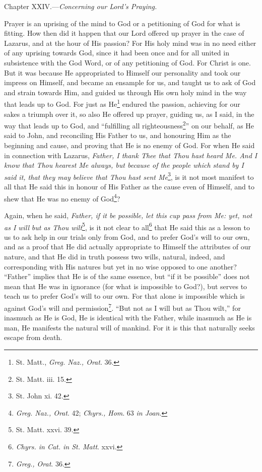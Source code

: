 
Chapter XXIV.—\emph{Concerning our Lord’s Praying.}

Prayer is an uprising of the mind to God or a petitioning of God for what is fitting. How then did it happen that our Lord offered up prayer in the case of Lazarus, and at the hour of His passion? For His holy mind was in no need either of any uprising towards God, since it had been once and for all united in subsistence with the God Word, or of any petitioning of God. For Christ is one. But it was because He appropriated to Himself our personality and took our impress on Himself, and became an ensample for us, and taught us to ask of God and strain towards Him, and guided us through His own holy mind in the way that leads up to God. For just as He\footnote{St. Matt., \emph{Greg. Naz., Orat}. 36.} endured the passion, achieving for our sakes a triumph over it, so also He offered up prayer, guiding us, as I said, in the way that leads up to God, and “fulfilling all righteousness\footnote{St. Matt. iii. 15.}” on our behalf, as He said to John, and reconciling His Father to us, and honouring Him as the beginning and cause, and proving that He is no enemy of God. For when He said in connection with Lazarus, \emph{Father, I thank Thee that Thou hast heard Me. And I know that Thou hearest Me always, but because of the people which stand by I said it, that they may believe that Thou hast sent Me}\footnote{St. John xi. 42.}, is it not most manifest to all that He said this in honour of His Father as the cause even of Himself, and to shew that He was no enemy of God\footnote{\emph{Greg. Naz., Orat}. 42; \emph{Chyrs., Hom}. 63 \emph{in Joan}.}?

Again, when he said, \emph{Father, if it be possible, let this cup pass from Me: yet, not as I will} \emph{but as Thou wilt}\footnote{St. Matt. xxvi. 39.}, is it not clear to all\footnote{\emph{Chyrs. in Cat. in St. Matt}. xxvi.} that He said this as a lesson to us to ask help in our trials only from God, and to prefer God’s will to our own, and as a proof that He did actually appropriate to Himself the attributes of our nature, and that He did in truth possess two wills, natural, indeed, and corresponding with His natures but yet in no wise opposed to one another? “Father” implies that He is of the same essence, but “if it be possible” does not mean that He was in ignorance (for what is impossible to God?), but serves to teach us to prefer God’s will to our own. For that alone is impossible which is against God’s will and permission\footnote{\emph{Greg., Orat}. 36.}. “But not as I will but as Thou wilt,” for inasmuch as He is God, He is identical with the Father, while inasmuch as He is man, He manifests the natural will of mankind. For it is this that naturally seeks escape from death.

